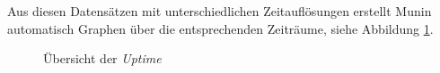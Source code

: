 Aus diesen Datensätzen mit unterschiedlichen Zeitauflösungen erstellt Munin automatisch Graphen über die entsprechenden Zeiträume, siehe Abbildung \ref{all4}.

\begin{figure}[ht]
	\centering
		\caption{Übersicht der \textit{Uptime}}
		\label{all4}
\end{figure}